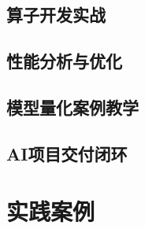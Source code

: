\documentclass[fontsize=10.5pt, paper=185mm:260mm, twoside=false, open=any]{scrbook}
\theoremstyle{break}
\begin{document}
\chapter{算子开发实战}


\chapter{性能分析与优化}


\chapter{模型量化案例教学}


\chapter{AI项目交付闭环}


\part{实践案例}

\setcounter{chapter}{0}
\renewcommand{\theHchapter}{case.\arabic{chapter}}
\renewcommand{\theHsection}{case.\arabic{chapter}.\arabic{section}}
\renewcommand{\theHsubsection}{case.\arabic{chapter}.\arabic{section}.\arabic{subsection}}
\renewcommand{\theHsubsubsection}{case.\arabic{chapter}.\arabic{section}.\arabic{subsection}.\arabic{subsubsection}}
\renewcommand{\theHfigure}{case.\arabic{chapter}.\arabic{figure}}
\renewcommand{\theHtable}{case.\arabic{chapter}.\arabic{table}}



















\end{document}
